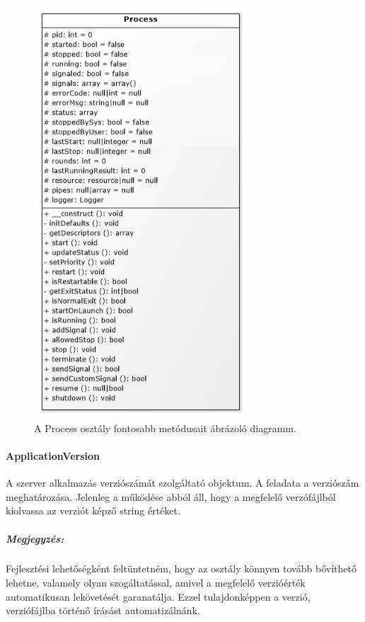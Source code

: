 \documentclass[12pt]{report}
\begin{document}
  \begin{figure}[ht]
       \centering
         \includegraphics[width=8cm]{pics/proc.png}
	  \caption{A Process osztály fontosabb metódusait ábrázoló diagramm.}
  \end{figure}
  
  \paragraph{ApplicationVersion}
  A szerver alkalmazás verziószámát szolgáltató objektum. A feladata a verziószám meghatározása. Jelenleg a működése abból áll, hogy a megfelelő verzófájlból kiolvassa az verziót képző string értéket.
  \subparagraph{Megjegyzés:} Fejlesztési lehetőségként feltüntetném, hogy az osztály könnyen tovább bővíthető lehetne, valamely olyan szogáltatással, amivel a megfelelő verzióérték automatikusan lekövetését garanatálja. Ezzel tulajdonképpen a verzió, verziófájlba történő írásást automatizálnánk.
\end{document}
